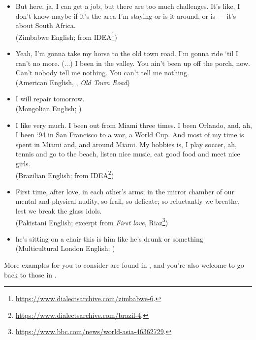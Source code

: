 \begin{itemize}
    \item But here, ja, I can get a job, but there are too much challenges. It's like, I don't know maybe if it's the area I'm staying or is it around, or is — it's about South Africa.\\	
    (Zimbabwe English; from IDEA\footnote{\url{https://www.dialectsarchive.com/zimbabwe-6}.})
    \item Yeah, I'm gonna take my horse to the old town road. I'm gonna ride `til I can't no more. (...) I been in the valley. You ain't been up off the porch, now. Can't nobody tell me nothing. You can't tell me nothing.\\(American English, , \emph{Old Town Road})
    \item I will repair tomorrow.\\(Mongolian English; \citealp[215]{Cohen2005})
    \item I like very much. I been out from Miami three times. I been Orlando, and, ah, I been `94 in San Francisco to a wor, a World Cup. And most of my time is spent in Miami and, and around Miami. My hobbies is, I play soccer, ah, tennis and go to the beach, listen nice music, eat good food and meet nice girls.\\(Brazilian English; from IDEA\footnote{\url{https://www.dialectsarchive.com/brazil-4}.})
    \item First time, after love, in each other's arms; in the mirror chamber of our mental and physical nudity, so frail, so delicate; so reluctantly we breathe, lest we break the glass idols.\\(Pakistani English; excerpt from \emph{First love}, Riaz\footnote{\url{https://www.bbc.com/news/world-asia-46362729}.})
    \item he's sitting on a chair this is him like he's drunk or something\\(Multicultural London English; \citealt[174]{CheshireKerswillFoxTorgersen2011})
\end{itemize}

\noindent More examples for you to consider are found in , and you're also welcome to go back to those in .


